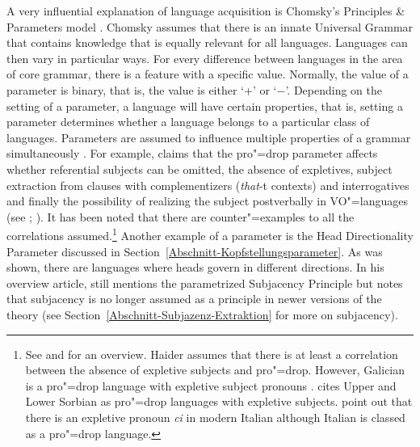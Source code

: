 A very influential explanation of language acquisition is Chomsky's Principles \& Parameters model
\citeyearpar{Chomsky81a}. Chomsky assumes that there is an innate Universal Grammar that contains knowledge that is equally relevant for all languages.
Languages can then vary in particular ways. For every difference between languages in the area of core grammar, there is a feature with a specific
value. Normally, the value of a parameter is binary, that is, the value is either `+' or `$-$'.
Depending on the setting of a parameter, a language will have certain properties, that is, setting a parameter determines whether
a language belongs to a particular class of languages.
Parameters are assumed to influence multiple properties of a grammar simultaneously
\citep[]{Chomsky81a}.
For example, \citet{Rizzi86a} claims that the pro"=drop parameter affects
whether referential subjects can be omitted, the absence of expletives, subject 
extraction from clauses with complementizers (\emph{that}-t contexts) and interrogatives and
finally the possibility of realizing the subject postverbally in VO"=languages (see
\citealp[Section~4.3]{Chomsky81a}; \citealp[]{Meisel95a}). It has been noted that there are counter"=examples to all the correlations assumed.\footnote{%
\label{fn-Expletiva-Pro-Drop}%
  See  and  for an overview. Haider assumes that there is at least a correlation
  between the absence of expletive subjects and pro"=drop. However, Galician is a pro"=drop language with expletive subject
  pronouns \citep[Section~2.5]{RU90a-u}. \citet[]{Franks95a-u} cites Upper and Lower Sorbian as pro"=drop
  languages with expletive subjects. \citet[]{SP2002b} point out that there is an expletive pronoun \emph{ci} in modern Italian
  although Italian is classed as a pro"=drop language.}
Another example of a parameter is the Head Directionality Parameter discussed in Section~\ref{Abschnitt-Kopfstellungsparameter}.
As was shown, there are languages where heads govern in different directions. In his overview article, \citet{Haider2001a} still mentions
the parametrized Subjacency Principle but notes that subjacency is no longer assumed as a principle
in newer versions of the theory (see Section~\ref{Abschnitt-Subjazenz-Extraktion} for more on subjacency).

